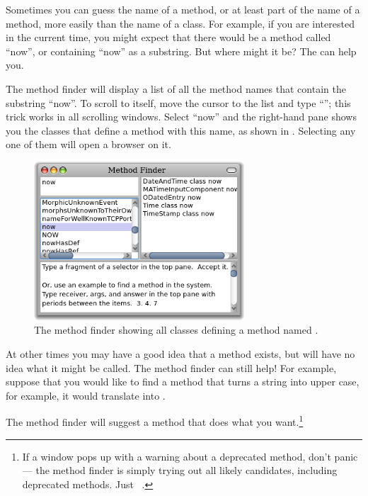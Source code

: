\documentclass[a4paper,10pt,twoside]{book}
\begin{document}
Sometimes you can guess the name of a method, or at least part of the name of a method, more easily than the name of a class.  For example, if you are interested in the current time, you might expect that there would be a method called ``now'', or containing ``now'' as a substring.   But where might it be?
The  can help you.

The method finder will display a list of all the method names that contain the substring ``now''.  
To scroll to  itself, move the cursor to the list and type ``''; this trick works in all scrolling windows.  Select ``now'' and the right-hand pane shows you the classes that define a method with this name, as shown in .  Selecting any one of them will open a browser on it.

\begin{figure}[hbt]
\centerline {\includegraphics[width=0.7\textwidth]{methodFinder-now}}
\caption{The method finder showing all classes defining a method named .
\label{fig:MethodFinder}}
\end{figure}

At other times you may have a good idea that a method exists, but will have no idea what it might be called.
The method finder can still help!  For example, suppose that you would like to find a method that turns a string into upper case, for example, it would translate  into .

\noindent
The method finder will suggest a method that does what you want.\footnote{If a window pops up with a warning about a deprecated method, don't panic --- the method finder is simply trying out all likely candidates, including deprecated methods. Just \click ~.}
\end{document}
